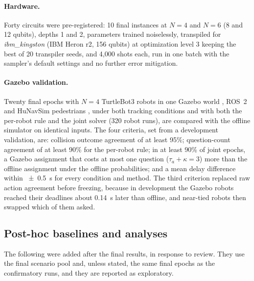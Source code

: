 \documentclass[a4paper,fleqn]{cas-dc}
\begin{document}
\paragraph{Hardware.} Forty circuits were pre-registered: 10 final instances at $N = 4$ and $N = 6$ (8 and 12 qubits), depths 1 and 2, parameters trained noiselessly, transpiled for \textit{ibm\_kingston} (IBM Heron r2, 156 qubits) at optimization level 3 keeping the best of 20 transpiler seeds, and 4{,}000 shots each, run in one batch with the sampler's default settings and no further error mitigation.

\paragraph{Gazebo validation.} Twenty final epochs with $N = 4$ TurtleBot3 robots in one Gazebo world \citep{koenig2004gazebo}, ROS~2 \citep{macenski2022ros2} and HuNavSim pedestrians \citep{perezhigueras2023hunavsim}, under both tracking conditions and with both the per-robot rule and the joint solver (320 robot runs), are compared with the offline simulator on identical inputs. The four criteria, set from a development validation, are: collision outcome agreement of at least 95\%; question-count agreement of at least 90\% for the per-robot rule; in at least 90\% of joint epochs, a Gazebo assignment that costs at most one question ($\tau_a + \kappa = 3$) more than the offline assignment under the offline probabilities; and a mean delay difference within \SI{\pm 0.5}{s} for every condition and method. The third criterion replaced raw action agreement before freezing, because in development the Gazebo robots reached their deadlines about \SI{0.14}{s} later than offline, and near-tied robots then swapped which of them asked.


\subsection{Post-hoc baselines and analyses}
\label{sec:posthoc-methods}

The following were added after the final results, in response to review. They use the final scenario pool and, unless stated, the same final epochs as the confirmatory runs, and they are reported as exploratory.
\end{document}

